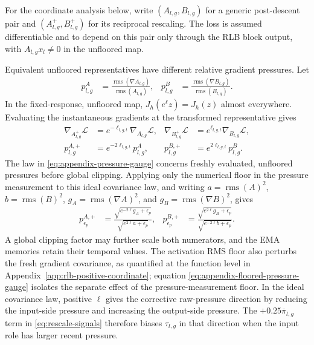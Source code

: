\documentclass{article}
\newcommand{\rms}{\operatorname{rms}}
\begin{document}
For the coordinate analysis below, write $(A_{l,g},B_{l,g})$ for a generic
post-descent pair and $(A^+_{l,g},B^+_{l,g})$ for its reciprocal rescaling.  The
loss is assumed differentiable and to depend on this pair only through the RLB
block output, with $A_{l,g}x_l\ne0$ in the unfloored map.

Equivalent unfloored representatives have different relative gradient
pressures.  Let
\begin{equation}
\begin{aligned}
    p^{A}_{l,g}
    &=
    \frac{\rms(\nabla A_{l,g})}{\rms(A_{l,g})},
    &
    p^{B}_{l,g}
    &=
    \frac{\rms(\nabla B_{l,g})}{\rms(B_{l,g})}.
\end{aligned}
\end{equation}
In the fixed-response, unfloored map,
$J_h(e^\ell z)=J_h(z)$ almost everywhere.  Evaluating the instantaneous
gradients at the transformed representative gives
\begin{equation}
\begin{aligned}
    \nabla_{A^+_{l,g}}\mathcal L
    &=e^{-\ell_{l,g,t}}\nabla_{A_{l,g}}\mathcal L,
    &
    \nabla_{B^+_{l,g}}\mathcal L
    &=e^{\ell_{l,g,t}}\nabla_{B_{l,g}}\mathcal L,
    \\
    p^{A,+}_{l,g}
    &=
    e^{-2\ell_{l,g,t}}p^{A}_{l,g},
    &
    p^{B,+}_{l,g}
    &=
    e^{2\ell_{l,g,t}}p^{B}_{l,g}.
\end{aligned}
    \label{eq:appendix-pressure-gauge}
\end{equation}
The law in \eqref{eq:appendix-pressure-gauge} concerns freshly evaluated,
unfloored pressures before global clipping.  Applying only the numerical floor
in the pressure measurement to this ideal covariance law, and writing
$a=\rms(A)^2$, $b=\rms(B)^2$, $g_A=\rms(\nabla A)^2$, and
$g_B=\rms(\nabla B)^2$, gives
\begin{equation}
\begin{aligned}
    p_{\epsilon_p}^{A,+}
    &=
    \frac{\sqrt{e^{-2\ell}g_A+\epsilon_p}}
         {\sqrt{e^{2\ell}a+\epsilon_p}},
    &
    p_{\epsilon_p}^{B,+}
    &=
    \frac{\sqrt{e^{2\ell}g_B+\epsilon_p}}
         {\sqrt{e^{-2\ell}b+\epsilon_p}}.
\end{aligned}
    \label{eq:appendix-floored-pressure-gauge}
\end{equation}
A global clipping factor may further scale both numerators, and the EMA memories
retain their temporal values.  The activation RMS floor also perturbs the fresh
gradient covariance, as quantified at the function level in
Appendix~\ref{app:rlb-positive-coordinate}; equation
\eqref{eq:appendix-floored-pressure-gauge} isolates the separate effect of the
pressure-measurement floor.  In the ideal covariance law, positive $\ell$ gives
the corrective raw-pressure direction by reducing the input-side pressure and
increasing the output-side pressure.  The $+0.25\bar\pi_{l,g}$ term in
\eqref{eq:rescale-signals} therefore biases $\tau_{l,g}$ in that direction when
the input role has larger recent pressure.
\end{document}
